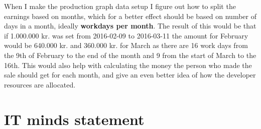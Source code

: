 When I make the production graph data setup I figure out how to split the
earnings based on months, which for a better effect should be based on number of
days in a month, ideally \textbf{workdays per month}. The result of this would be that if
1.000.000 kr. was set from 2016-02-09 to 2016-03-11 the amount for February
would be 640.000 kr. and 360.000 kr. for March as there are 16 work days from
the 9th of February to the end of the month and 9 from the start of March to the
16th. This would also help with calculating the money the person who made the
sale should get for each month, and give an even better idea of how the
developer resources are allocated.

\section{IT minds statement}
